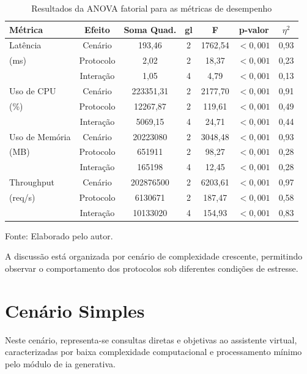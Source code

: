 \begin{table}[h]
\centering
\caption{Resultados da ANOVA fatorial para as métricas de desempenho}
\label{tab:5-resultados-anova}
\begin{tabular}{lcccccc}
\hline
\textbf{Métrica} & \textbf{Efeito} & \textbf{Soma Quad}. & \textbf{gl} & \textbf{F} & \textbf{p-valor} & \textbf{$\eta^2$} \\ 
\hline
Latência & Cenário & 193,46 & 2 & 1762,54 & $< 0,001$ & 0,93 \\
(ms) & Protocolo & 2,02 & 2 & 18,37 &$< 0,001$ & 0,23 \\
& Interação & 1,05 & 4 & 4,79 & $< 0,001$ & 0,13 \\
\hline
Uso de CPU & Cenário & 223351,31 & 2 & 2177,70 & $< 0,001$ & 0,91 \\
(\%) & Protocolo & 12267,87 & 2 & 119,61 & $< 0,001$ & 0,49 \\
& Interação & 5069,15 & 4 & 24,71 & $< 0,001$ & 0,44 \\
\hline
Uso de Memória & Cenário & 20223080 & 2 & 3048,48 & $< 0,001$ & 0,93 \\
(MB) & Protocolo & 651911 & 2 & 98,27 & $< 0,001$ & 0,28 \\
& Interação & 165198 & 4 & 12,45 & $< 0,001$ & 0,28 \\
\hline
Throughput & Cenário & 202876500 & 2 & 6203,61 & $< 0,001$ & 0,97 \\
(req/s) & Protocolo & 6130671 & 2 & 187,47 & $< 0,001$ & 0,58 \\
& Interação & 10133020 & 4 & 154,93 & $< 0,001$ & 0,83 \\
\hline
\end{tabular}
{\par \raggedright \footnotesize Fonte: Elaborado pelo autor.}
\end{table}

A discussão está organizada por cenário de complexidade crescente, permitindo observar o comportamento dos protocolos sob diferentes condições de estresse.

\section{Cenário Simples}
\label{sec:cenario_simples}

Neste cenário, representa-se consultas diretas e objetivas ao assistente virtual, caracterizadas por baixa complexidade computacional e processamento mínimo pelo módulo de \acrfull{ia} generativa.

